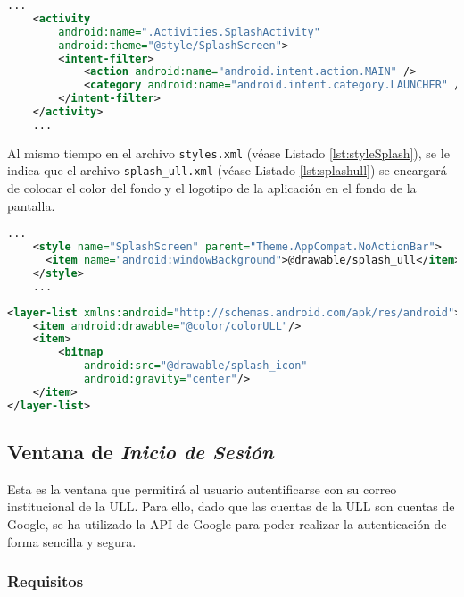 \begin{lstlisting}[language=XML,caption={Fichero \texttt{AndroidManifest.xml}, activity que inicia la aplicación.}, label={lst:manifestInicio}]
    ...
    <activity
        android:name=".Activities.SplashActivity"
        android:theme="@style/SplashScreen">
        <intent-filter> 
            <action android:name="android.intent.action.MAIN" />
            <category android:name="android.intent.category.LAUNCHER" />
        </intent-filter>
    </activity>
    ...
\end{lstlisting}

Al mismo tiempo en el archivo \texttt{styles.xml} (véase Listado \ref{lst:styleSplash}), se le indica que el archivo \texttt{splash\_ull.xml} (véase Listado \ref{lst:splashull}) se encargará de colocar el color del fondo y el logotipo de la aplicación en el fondo de la pantalla. 

\begin{lstlisting}[language=XML,caption={Fichero \texttt{styles.xml}, estilo de la \textit{Splash Screen}.}, label={lst:styleSplash}]
    ...
    <style name="SplashScreen" parent="Theme.AppCompat.NoActionBar">
      <item name="android:windowBackground">@drawable/splash_ull</item>
    </style>
    ...
\end{lstlisting}

\begin{lstlisting}[language=XML,caption={Fichero  \texttt{splash\_ull.xml}, configuración del color de fondo y el logotipo de la aplicación. }, label={lst:splashull}]
<layer-list xmlns:android="http://schemas.android.com/apk/res/android">
    <item android:drawable="@color/colorULL"/>
    <item>
        <bitmap
            android:src="@drawable/splash_icon"
            android:gravity="center"/>
    </item>
</layer-list>
\end{lstlisting}

\subsection{Ventana de \textit{Inicio de Sesión} }

Esta es la ventana que permitirá al usuario autentificarse con su correo institucional de la ULL. Para ello, dado que las cuentas de la ULL son cuentas de Google, se ha utilizado la API de Google para poder realizar la autenticación de forma sencilla y segura.

\subsubsection{ Requisitos }  

